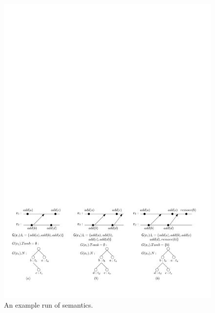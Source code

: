 \begin{figure}[t]
  \centering
  \includegraphics[width=0.9 \textwidth]{figures/ExplainSemantics.pdf}
\vspace{-10pt}
  \caption{An example run of semantics.}
  \label{fig:an example run of semantics}
\end{figure}































































